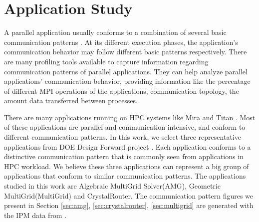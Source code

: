 \documentclass[conference]{IEEEtran}
\begin{document}
\section{Application Study}
\label{sec:application study}


A parallel application usually conforms to a combination of several basic communication patterns \cite{roth}. At its different execution phases, the application's communication behavior may follow different basic patterns respectively. There are many profiling tools \cite{tau}\cite{mpip}\cite{scala}\cite{sst}\cite{oxbow} available to capture information regarding communication patterns of parallel applications. They can help analyze parallel applications' communication behavior, providing information like the percentage of different MPI operations of the applications, communication topology, the amount data transferred between processes.

There are many applications running on HPC systems like Mira \cite{bgq} and Titan \cite{titan}. Most of these applications are parallel and communication intensive, and conform to different communication patterns. In this work, we select three representative applications from DOE Design Forward project \cite{design forward webpage}. Each application conforms to a distinctive communication pattern that is commonly seen from applications in HPC workload. We believe these three applications can represent a big group of applications that conform to similar communication patterns. The applications studied in this work are Algebraic MultiGrid Solver(AMG), Geometric MultiGrid(MultiGrid) and CrystalRouter. The communication pattern figures we present in Section \ref{sec:amg}, \ref{sec:crystalrouter}, \ref{sec:multigrid} are generated with the IPM \cite{ipm} data from \cite{design forward webpage}.
\end{document}
